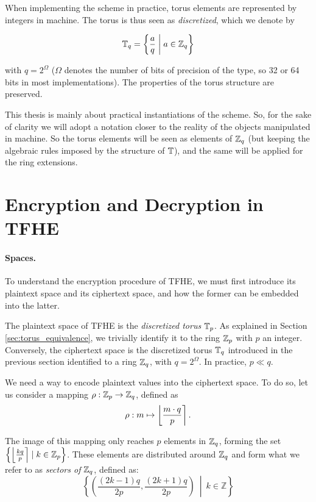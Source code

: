 When implementing the scheme in practice, torus elements are represented by integers in machine. The torus is thus seen as \textit{discretized}, which we denote by 

\[ \mathbb{T}_q = \left \{   \frac a q \;\middle|\; a \in \mathbb{Z}_q  \right \} \] 

with $q = 2^\Omega$ ($\Omega$ denotes the number of bits of precision of the type, so 32 or 64 bits in most implementations). The properties of the torus structure are preserved.


This thesis is mainly about practical instantiations of the scheme. So, for the sake of clarity we will adopt a notation closer to the reality of the objects manipulated in machine. So the torus elements will be seen as elements of $\mathbb{Z}_q$ (but keeping the algebraic rules imposed by the structure of $\mathbb{T}$), and the same will be applied for the ring extensions. 



\section{Encryption and Decryption in TFHE}
\label{sec:encryption}

\paragraph{Spaces.}

To understand the encryption procedure of TFHE, we must first introduce its plaintext space and its ciphertext space, and how the former can be embedded into the latter.

The plaintext space of TFHE is the \textit{discretized torus} $\mathbb{T}_p$. As explained in Section \ref{sec:torus_equivalence}, we trivially identify it to the ring $\mathbb{Z}_p$ with $p$ an integer. Conversely, the ciphertext space is the discretized torus $\mathbb{T}_q$ introduced in the previous section identified to a ring $\mathbb{Z}_q$, with $q = 2^\Omega$. In practice, $p \ll q$.


We need a way to encode plaintext values into the ciphertext space. To do so, let us consider a mapping $\rho: \mathbb{Z}_p \rightarrow \mathbb{Z}_q$, defined as \[
\rho: m  \mapsto \left \lfloor \frac{m \cdot q} {p} \right \rceil.
\]


The image of this mapping only reaches $p$ elements in $\mathbb{Z}_q$, forming the set $\left \{ \left \lfloor \frac {k q}{p} \right \rceil \mid k \in \mathbb{Z}_p \right \}$. These elements are distributed around $\mathbb{Z}_q$ and form what we refer to as \emph{sectors of $\mathbb{Z}_q$}, defined as: \[
\left\{ \left( \frac{(2k - 1)q}{2p}, \frac{(2k + 1)q}{2p} \right) ~\middle|~ k \in \mathbb{Z} \right\}
\]


